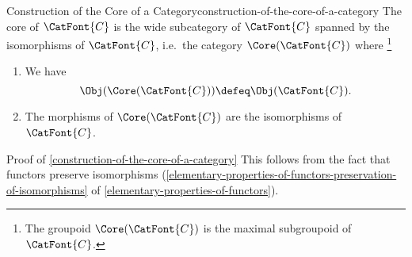 \begin{construction}{Construction of the Core of a Category}{construction-of-the-core-of-a-category}%
    The core of $\CatFont{C}$ is the wide subcategory of $\CatFont{C}$ spanned by the isomorphisms of $\CatFont{C}$, i.e.\ the category $\Core(\CatFont{C})$ where%
    \footnote{%
        The groupoid $\Core(\CatFont{C})$ is the maximal subgroupoid of $\CatFont{C}$.
        \par\vspace*{\TCBBoxCorrection}
    }%
    \begin{enumerate}
        \item{}We have
            \[
                \Obj(\Core(\CatFont{C}))
                \defeq
                \Obj(\CatFont{C}).
            \]%
        \item{}The morphisms of $\Core(\CatFont{C})$ are the isomorphisms of $\CatFont{C}$.
    \end{enumerate}
\end{construction}
\begin{Proof}{Proof of \cref{construction-of-the-core-of-a-category}}%
    This follows from the fact that functors preserve isomorphisms (\cref{elementary-properties-of-functors-preservation-of-isomorphisms} of \cref{elementary-properties-of-functors}).
\end{Proof}
